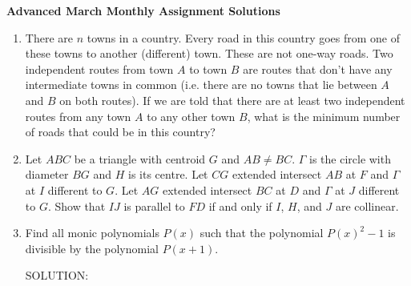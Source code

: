 \documentclass{article}
\begin{document}
\thispagestyle{empty}

\begin{center}
  \textbf{\Large Advanced March Monthly Assignment Solutions}
\end{center}


\begin{enumerate}[1.]
\vfill
\item %
There are $n$ towns in a country.
Every road in this country goes from one of these towns to another (different) town. These are not one-way roads.
Two independent routes from town $A$ to town $B$ are routes that don't have any intermediate towns in common (i.e. there are no towns that lie between $A$ and $B$ on both routes).
If we are told that there are at least two independent routes from any town $A$ to any other town $B$, what is the minimum number of roads that could be in this country?


\vfill
\item %
Let $ABC$ be a triangle with centroid $G$ and $AB\neq BC$.
$\Gamma$ is the circle with diameter $BG$ and $H$ is its centre.
Let $CG$ extended intersect $AB$ at $F$ and $\Gamma$ at $I$ different to $G$.
Let $AG$ extended intersect $BC$ at $D$ and $\Gamma$ at $J$ different to $G$. Show that $IJ$ is parallel to $FD$ if and only if $I$, $H$, and $J$ are collinear.


\vfill
\item %
Find all monic polynomials $P(x)$ such that the polynomial $P(x)^2-1$ is divisible by the polynomial $P(x+1)$.

SOLUTION:\\


\end{enumerate}
\end{document}
